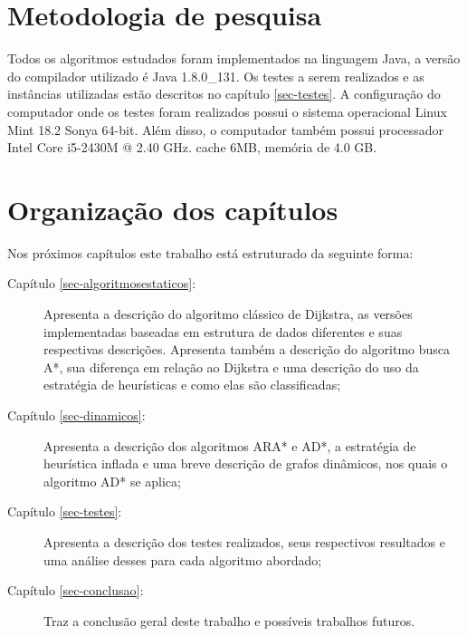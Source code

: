 \section{Metodologia de pesquisa}
\label{sec-intro-metodologia}
Todos os algoritmos estudados foram implementados na linguagem Java, a versão do compilador utilizado é Java 1.8.0\_131. Os testes a serem realizados e as instâncias utilizadas estão descritos no capítulo \ref{sec-testes}. A configuração do computador onde os testes foram realizados possui o sistema operacional Linux Mint 18.2 Sonya 64-bit. Além disso, o computador também possui processador Intel Core i5-2430M @ 2.40 GHz. cache 6MB, memória de 4.0 GB.
\newpage
\section{Organização dos capítulos}
\label{sec-intro-organizaocao}
Nos próximos capítulos este trabalho está estruturado da seguinte forma:
\begin{description}
\item[Capítulo \ref{sec-algoritmosestaticos}:] Apresenta a descrição do algoritmo clássico de Dijkstra, as versões implementadas baseadas em estrutura de dados diferentes e suas respectivas descrições. Apresenta também a descrição do algoritmo busca A*, sua diferença em relação ao Dijkstra e uma descrição do uso da estratégia de heurísticas e como elas são classificadas;
\item[Capítulo \ref{sec-dinamicos}:] Apresenta a descrição dos algoritmos ARA* e AD*, a estratégia de heurística inflada e uma breve descrição de grafos dinâmicos, nos quais o algoritmo AD* se aplica;
\item[Capítulo \ref{sec-testes}:] Apresenta a descrição dos testes realizados, seus respectivos resultados e uma análise desses para cada algoritmo abordado;
\item[Capítulo \ref{sec-conclusao}:] Traz a conclusão geral deste trabalho e possíveis trabalhos futuros.
\end{description}